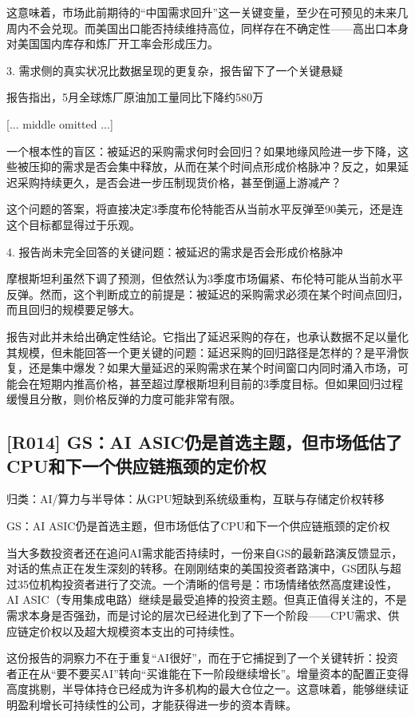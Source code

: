 \documentclass[11pt]{ctexart}
\begin{document}
这意味着，市场此前期待的“中国需求回升”这一关键变量，至少在可预见的未来几周内不会兑现。而美国出口能否持续维持高位，同样存在不确定性——高出口本身对美国国内库存和炼厂开工率会形成压力。

3. 需求侧的真实状况比数据呈现的更复杂，报告留下了一个关键悬疑

报告指出，5月全球炼厂原油加工量同比下降约580万

[... middle omitted ...]

一个根本性的盲区：被延迟的采购需求何时会回归？如果地缘风险进一步下降，这些被压抑的需求是否会集中释放，从而在某个时间点形成价格脉冲？反之，如果延迟采购持续更久，是否会进一步压制现货价格，甚至倒逼上游减产？

这个问题的答案，将直接决定3季度布伦特能否从当前水平反弹至90美元，还是连这个目标都显得过于乐观。

4. 报告尚未完全回答的关键问题：被延迟的需求是否会形成价格脉冲

摩根斯坦利虽然下调了预测，但依然认为3季度市场偏紧、布伦特可能从当前水平反弹。然而，这个判断成立的前提是：被延迟的采购需求必须在某个时间点回归，而且回归的规模要足够大。

报告对此并未给出确定性结论。它指出了延迟采购的存在，也承认数据不足以量化其规模，但未能回答一个更关键的问题：延迟采购的回归路径是怎样的？是平滑恢复，还是集中爆发？如果大量延迟的采购需求在某个时间窗口内同时涌入市场，可能会在短期内推高价格，甚至超过摩根斯坦利目前的3季度目标。但如果回归过程缓慢且分散，则价格反弹的力度可能非常有限。

\subsection{[R014] GS：AI ASIC仍是首选主题，但市场低估了CPU和下一个供应链瓶颈的定价权}
{\small\color{refgray}归类：AI/算力与半导体：从GPU短缺到系统级重构，互联与存储定价权转移}

GS：AI ASIC仍是首选主题，但市场低估了CPU和下一个供应链瓶颈的定价权

当大多数投资者还在追问AI需求能否持续时，一份来自GS的最新路演反馈显示，对话的焦点正在发生深刻的转移。在刚刚结束的美国投资者路演中，GS团队与超过35位机构投资者进行了交流。一个清晰的信号是：市场情绪依然高度建设性，AI ASIC（专用集成电路）继续是最受追捧的投资主题。但真正值得关注的，不是需求本身是否强劲，而是讨论的层次已经进化到了下一个阶段——CPU需求、供应链定价权以及超大规模资本支出的可持续性。

这份报告的洞察力不在于重复“AI很好”，而在于它捕捉到了一个关键转折：投资者正在从“要不要买AI”转向“买谁能在下一阶段继续增长”。增量资本的配置正变得高度挑剔，半导体持仓已经成为许多机构的最大仓位之一。这意味着，能够继续证明盈利增长可持续性的公司，才能获得进一步的资本青睐。
\end{document}
